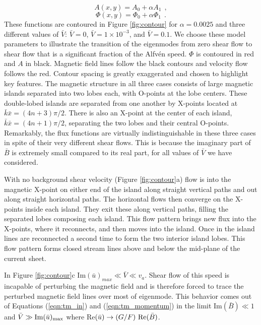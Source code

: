 	\begin{equation}
	\label{eqn:A}
	A(x,y) = A_{0} + \alpha A_{1}~~,
	\end{equation}
	\begin{equation}
	\label{eqn:PHI}
	\Phi(x,y) = \Phi_{0} + \alpha \Phi_{1}~~.
	\end{equation}
These functions are contoured in Figure \ref{fig:contour} for $\alpha=0.0025$ and  three different values of $\bar{V}$: $\bar{V}=0$, $\bar{V}=1 \times 10^{-3}$, and $\bar{V} = 0.1$. We choose these model parameters to illustrate the transition of the eigenmodes from zero shear flow to shear flow that is a significant fraction of the Alfv\'en speed.	 $\Phi$ is contoured in red and $ A$ in black.  Magnetic field lines follow the black contours and velocity flow follows the red. Contour spacing is greatly exaggerated and chosen to highlight key features.   The magnetic structure in all three cases consists of large magnetic islands separated into two lobes each, with O-points at the lobe centers.  These double-lobed islands are separated from one another by 
X-points located at $\bar{k}\bar{x}= (4n+3)\pi/2$.  There is also an X-point at the center of each island, 
$\bar{k}\bar{x}= (4n+1)\pi/2$, separating the two lobes and their central O-points.  Remarkably, the flux functions are virtually indistinguishable in these three cases in spite of their very different shear flows.  This is because the imaginary part of 
$\bar{B}$ is extremely small compared to its real part, for all values of $\bar{V}$ we have considered.
	
	 With no background shear velocity (Figure \ref{fig:contour}a) flow is into the magnetic X-point on either end of the island along straight vertical paths and out along straight horizontal paths. The horizontal flows then converge on the X-points inside each island.  They exit these along vertical paths, filling the separated lobes composing each island.   This flow pattern brings new flux into the X-points, where it reconnects, and then moves into the island. Once in the island lines are reconnected a second time to form the two interior island lobes.  This flow pattern forms closed stream lines above and below the mid-plane of the current sheet.
	 
	 In Figure \ref{fig:contour}c Im$(\bar{u})_{max} \ll \bar{V} \ll v_a$. Shear flow of this speed is incapable of perturbing the magnetic field and is therefore forced to trace the perturbed magnetic field lines over most of eigenmode.  This behavior comes out of Equations (\ref{eqn:tm_in}) and (\ref{eqn:tm_momentum}) in the limit Im$(\bar{B}) \ll 1$ and $\bar{V} \gg {\rm Im}(\bar{u})_{\rm max}$ where Re$(\bar{u}) \rightarrow (G/F)~{\rm Re}(\bar{B})$.  
	 

